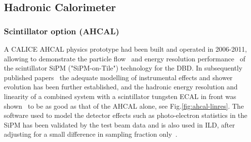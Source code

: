 \subsection{Hadronic Calorimeter}
\label{ild:sec:HCAL}

\subsubsection{Scintillator option (AHCAL)}

A CALICE AHCAL physics prototype had been built and operated in 2006-2011, allowing to demonstrate the particle flow~\cite{Adloff:2011ha} and energy resolution performance~\cite{Adloff:2012gv} of the scintillator SiPM ("SiPM-on-Tile") technology for the DBD. In subsequently published papers~\cite{Adloff:2013vra,Adloff:2013kio,Adloff:2013jqa,Adloff:2014rya,Bilki:2014bga,Lucaci-Timoce:2013tkf,Price:2016sce} the adequate modelling of instrumental effects and shower evolution has been further established, and the hadronic energy resolution and linearity of a combined system with a scintillator tungsten ECAL in front was shown~\cite{Repond:2018flg} to be as good as that of the AHCAL alone, see Fig.\ref{fig:ahcal-linres}. The software used to model the detector effects such as photo-electron statistics in the SiPM has been validated by the test beam data and is also used in ILD, after adjusting for a small difference in sampling fraction only~\cite{Hartbrich:2016bbz}.
